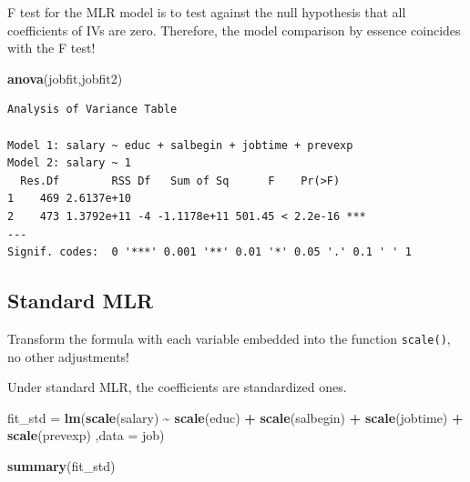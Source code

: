 \documentclass[
]{ctexart}
\newenvironment{Shaded}{\begin{snugshade}}{\end{snugshade}}
\newcommand{\AttributeTok}[1]{\textcolor[rgb]{0.13,0.29,0.53}{#1}}
\newcommand{\FunctionTok}[1]{\textcolor[rgb]{0.13,0.29,0.53}{\textbf{#1}}}
\newcommand{\NormalTok}[1]{#1}
\newcommand{\OtherTok}[1]{\textcolor[rgb]{0.56,0.35,0.01}{#1}}
\newcommand{\SpecialCharTok}[1]{\textcolor[rgb]{0.81,0.36,0.00}{\textbf{#1}}}
\begin{document}
F test for the MLR model is to test against the null hypothesis that all
coefficients of IVs are zero. Therefore, the model comparison by essence
coincides with the F test!

\begin{Shaded}
\begin{Highlighting}[]
\FunctionTok{anova}\NormalTok{(jobfit,jobfit2)}
\end{Highlighting}
\end{Shaded}

\begin{verbatim}
Analysis of Variance Table

Model 1: salary ~ educ + salbegin + jobtime + prevexp
Model 2: salary ~ 1
  Res.Df        RSS Df   Sum of Sq      F    Pr(>F)    
1    469 2.6137e+10                                    
2    473 1.3792e+11 -4 -1.1178e+11 501.45 < 2.2e-16 ***
---
Signif. codes:  0 '***' 0.001 '**' 0.01 '*' 0.05 '.' 0.1 ' ' 1
\end{verbatim}

\hypertarget{standard-mlr-1}{%
\subsection{Standard MLR}\label{standard-mlr-1}}

Transform the formula with each variable embedded into the function
\texttt{scale()}, no other adjustments!

Under standard MLR, the coefficients are standardized ones.

\begin{Shaded}
\begin{Highlighting}[]
\NormalTok{fit\_std }\OtherTok{=} \FunctionTok{lm}\NormalTok{(}\FunctionTok{scale}\NormalTok{(salary) }\SpecialCharTok{\textasciitilde{}} \FunctionTok{scale}\NormalTok{(educ) }\SpecialCharTok{+} \FunctionTok{scale}\NormalTok{(salbegin) }\SpecialCharTok{+} \FunctionTok{scale}\NormalTok{(jobtime) }\SpecialCharTok{+} \FunctionTok{scale}\NormalTok{(prevexp)}
\NormalTok{             ,}\AttributeTok{data =}\NormalTok{ job)}
\end{Highlighting}
\end{Shaded}

\begin{Shaded}
\begin{Highlighting}[]
\FunctionTok{summary}\NormalTok{(fit\_std)}
\end{Highlighting}
\end{Shaded}
\end{document}
